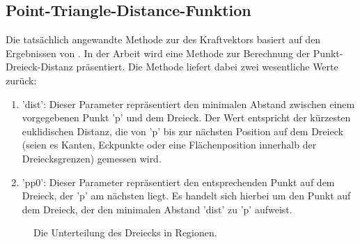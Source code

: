 \documentclass[conference]{IEEEtran}
\begin{document}
\subsection{Point-Triangle-Distance-Funktion}\label{dist}
Die tatsächlich angewandte Methode zur des Kraftvektors basiert auf den Ergebnissen 
von . In der Arbeit wird eine Methode zur Berechnung der Punkt-Dreieck-Distanz präsentiert. Die Methode liefert dabei zwei wesentliche Werte zurück:

\begin{enumerate}
\item 'dist': Dieser Parameter repräsentiert den minimalen Abstand zwischen einem vorgegebenen Punkt 'p' und dem Dreieck. Der Wert entspricht der kürzesten euklidischen Distanz, die von 'p' bis zur nächsten Position auf dem Dreieck (seien es Kanten, Eckpunkte oder eine Flächenposition innerhalb der Dreiecksgrenzen) 
gemessen wird.
\item 'pp0': Dieser Parameter repräsentiert den entsprechenden Punkt auf dem Dreieck, der 'p' am nächsten liegt. Es handelt sich hierbei um den Punkt auf dem Dreieck, der den minimalen Abstand 'dist' zu 'p' aufweist.
\end{enumerate}


\begin{figure}[h] 
    \centering
    \caption{Die Unterteilung des Dreiecks in Regionen.}
    \label{fig:regions}
\end{figure}
\end{document}

